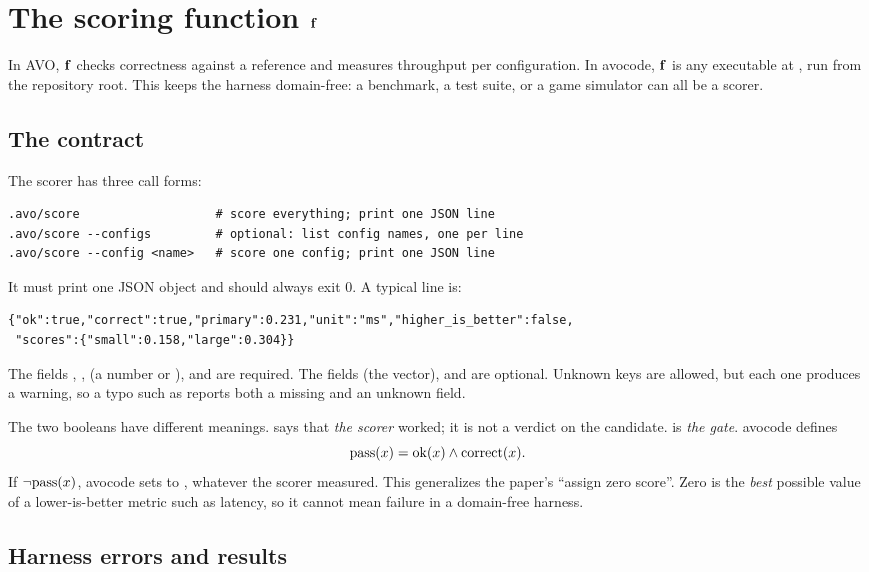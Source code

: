 \section{The scoring function \texorpdfstring{$\mathbf{f}$}{f}}
\label{sec:score}

In AVO, $\mathbf{f}$ checks correctness against a reference and measures throughput per configuration. In
avocode, $\mathbf{f}$ is any executable at , run from the repository root. This keeps the
harness domain-free: a benchmark, a test suite, or a game simulator can all be a scorer.

\subsection{The contract}

The scorer has three call forms:
\begin{lstlisting}
.avo/score                   # score everything; print one JSON line
.avo/score --configs         # optional: list config names, one per line
.avo/score --config <name>   # score one config; print one JSON line
\end{lstlisting}
It must print one JSON object and should always exit 0. A typical line is:
\begin{lstlisting}
{"ok":true,"correct":true,"primary":0.231,"unit":"ms","higher_is_better":false,
 "scores":{"small":0.158,"large":0.304}}
\end{lstlisting}
The fields , ,  (a number or ),  and
 are required. The fields  (the vector),  and
 are optional. Unknown keys are allowed, but each one produces a warning, so a typo
such as  reports both a missing and an unknown field.

The two booleans have different meanings.  says that \emph{the scorer} worked; it is not a
verdict on the candidate.  is \emph{the gate}. avocode defines
\begin{equation}
  \mathrm{pass}(x) = \mathrm{ok}(x) \wedge \mathrm{correct}(x).
\end{equation}
If $\neg\mathrm{pass}(x)$, avocode sets  to , whatever the scorer measured. This
generalizes the paper's ``assign zero score''. Zero is the \emph{best} possible value of a
lower-is-better metric such as latency, so it cannot mean failure in a domain-free harness.

\subsection{Harness errors and results}

